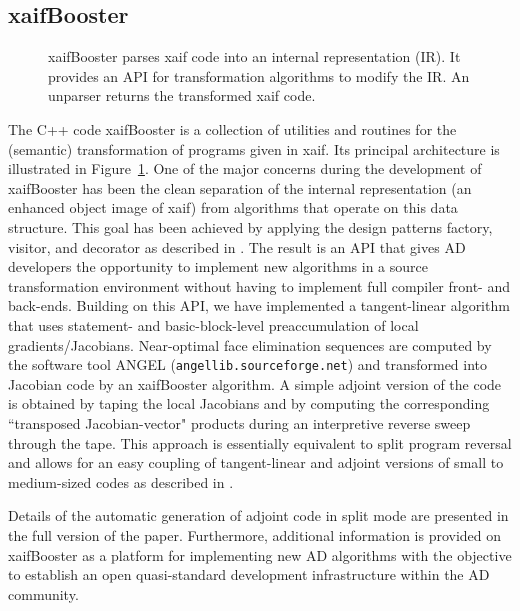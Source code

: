 \documentclass[acmtocl,acmnow]{acmtrans2m}
\newcommand{\fig}[1]{Figure~#1}
\begin{document}
\subsection{xaifBooster} 
\begin{figure}
\caption{xaifBooster parses xaif code into an internal representation (IR).
It provides an API for transformation algorithms to modify the IR. An unparser
returns the transformed xaif code.} \label{fig:xaifBooster}
\end{figure}
The C++ code xaifBooster is a collection of utilities and routines for the
(semantic) transformation of programs given in xaif. Its principal architecture 
is illustrated in \fig{\ref{fig:xaifBooster}}. One of the major concerns during
the development of xaifBooster has been the clean separation of the internal
representation (an enhanced object image of xaif) from algorithms that operate 
on this data structure. This goal has been achieved by applying the design 
patterns \cite{DesignPatterns} factory, visitor, and decorator as described in \cite{UtNa03}.
The result is an API that gives AD developers the opportunity
to implement new algorithms in a source transformation environment without
having to implement full compiler front- and back-ends. Building on
this API, we have implemented a tangent-linear algorithm that uses statement-
\cite{SEUpreacc} and basic-block-level preaccumulation of local 
gradients/Jacobians. Near-optimal face elimination \cite{ElimTechMP} sequences 
are computed by the software tool 
ANGEL \cite{AGN03,SAGA} ({\tt angellib.sourceforge.net}) and transformed into 
Jacobian code by
an xaifBooster algorithm. A simple adjoint version of the code is obtained
by taping the local Jacobians 
and by computing the corresponding ``transposed Jacobian-vector" products 
during an interpretive reverse sweep through the tape. This approach is
essentially equivalent to split program reversal \cite{Gri00} and allows
for an easy coupling of tangent-linear and adjoint versions of small to 
medium-sized codes as described in \cite{NaHe03}. 

Details of the automatic generation of adjoint code in split mode are presented
in the full version of the paper. Furthermore, additional information is 
provided on xaifBooster as a platform for implementing new AD algorithms with 
the objective to establish an open quasi-standard development infrastructure
within the AD community.
\end{document}
